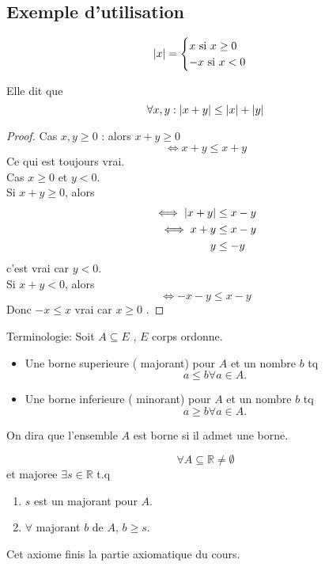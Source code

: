 \documentclass[../main.tex]{subfiles}
\begin{document}
\subsection{Exemple d'utilisation}
\begin{defn}\label{defn:valeur_absolue}
	\[ 
		\left\vert x\right\vert = 
		\begin{cases}
			x \text{ si } x \geq 0\\
			-x \text{ si } x < 0\\
		\end{cases}
	\]
\end{defn}
\begin{propo}
	Elle dit que
	\[ 
		\forall x,y : \left\vert x + y\right\vert \leq \left\vert x\right\vert + \left\vert y\right\vert
	\]
\end{propo}
\begin{proof}
Cas $x,y \geq 0$ : alors $x+y \geq 0$ 
\[ 
\iff x+y \leq x + y
\]
Ce qui est toujours vrai.\\
Cas $x\geq 0 $ et $y < 0$.\\
Si $x+y \geq 0$, alors
\begin{align*}
	\iff \left\vert x+y\right\vert &\leq x -y\\
	\iff x+ y &\leq x-y\\
	y &\leq -y
\end{align*}
c'est vrai car $y<0$.\\
Si $x+y < 0$, alors 
\[ 
\iff -x-y \leq x -y
\]
Donc $ -x \leq x$ vrai car $x \geq 0$ .

\end{proof}
\begin{defn}[Bornes]\label{defn:bornes}
	Terminologie: Soit $A \subseteq E$ , $E$ corps ordonne.
	\begin{itemize}
		\item Une borne superieure ( majorant) pour $A$ et un nombre $b$ tq
			\[ 
			a \leq b \forall a \in A.
			\]
		\item Une borne inferieure ( minorant) pour $A$ et un nombre $b$ tq
			\[ 
			a \geq b \forall a \in A.		
			\]
	\end{itemize}
	On dira que l'ensemble $A$ est borne si il admet une borne.
\end{defn}
\begin{axiom}\label{axiom:axiome_de_completude}
	\[ 
	\forall A \subseteq \mathbb{R} \neq \emptyset
	\]
	et majoree $\exists s \in \mathbb{R}$ t.q
	\begin{enumerate}
		\item $s$ est un majorant pour $A$.\\
		\item $\forall$ majorant $b$ de $A$, $b \geq s$.
	\end{enumerate}
	Cet axiome finis la partie axiomatique du cours.
\end{axiom}
\end{document}
